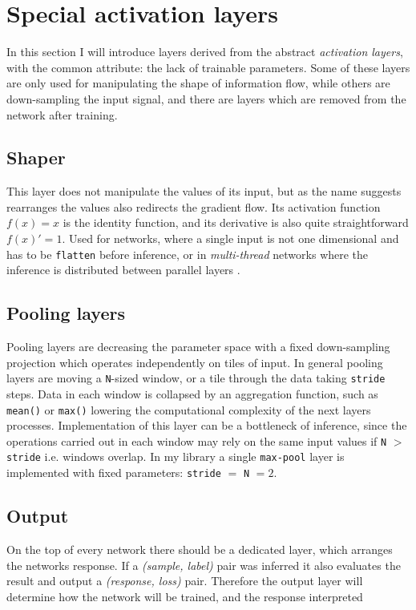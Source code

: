 

\section{Special activation layers}
In this section I will introduce layers derived from the abstract \emph{activation layers}, with the common attribute: the lack of trainable parameters. 
Some of these layers are only used for manipulating the shape of information flow, 
while others are down-sampling the input signal, 
and there are layers which are removed from the network after training.

\subsection{Shaper} This layer does not manipulate the values of its input, but as the name suggests rearranges the values also redirects the gradient flow.
Its activation function $f(x) = x$ is the identity function, and its derivative is also quite straightforward $f(x)'=1$.
Used for networks, where a single input is not one dimensional and has to be \texttt{flatten} before inference, or in \emph{multi-thread} networks where the inference is distributed between parallel layers \cite{szegedy2015going}.

\subsection{Pooling layers} Pooling layers are decreasing the parameter space with a fixed down-sampling projection which operates independently on tiles of input.
In general pooling layers are moving a \texttt{N}-sized window, or a tile through the data taking \texttt{stride} steps.
Data in each window is collapsed by an aggregation function, such as \texttt{mean()} or \texttt{max()} lowering the computational complexity of the next layers processes. Implementation of this layer can be a bottleneck of inference, since the operations carried out in each window may rely on the same input values if \texttt{N} $>$ \texttt{stride} i.e. windows overlap. In my library a single \texttt{max-pool} layer is implemented with fixed parameters: \texttt{stride} $=$ \texttt{N} $=2$.

\subsection{Output} 
On the top of every network there should be a dedicated layer, which arranges the networks response. 
If a \emph{(sample, label)} pair was inferred it also evaluates the result and output a \emph{(response, loss)} pair.
Therefore the output layer will determine how the network will be trained, and the response interpreted
